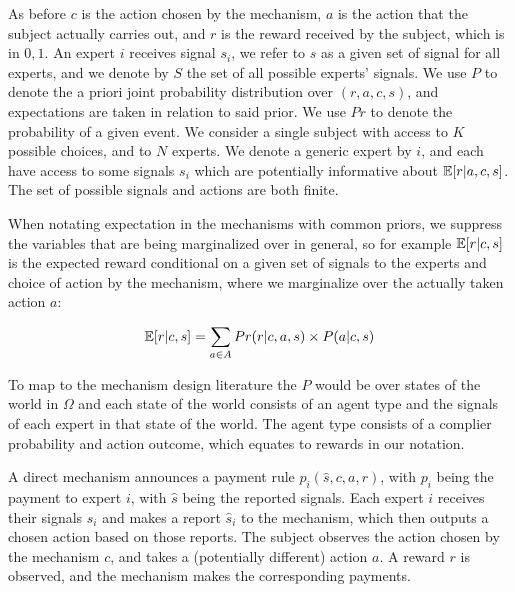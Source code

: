 As before $c$ is the action chosen by the mechanism, $a$ is the action that the subject actually carries out, and $r$ is the reward received by the subject, which is in ${0,1}$. An expert $i$ receives signal $s_i$, we refer to $s$ as a given set of signal for all experts, and we denote by $S$ the set of all possible experts' signals.
We use $P$ to denote the a priori joint probability distribution over $(r,a,c,s)$, and expectations are taken in relation to said prior.
We use $Pr$ to denote the probability of a given event.
We consider a single subject with access to $K$ possible choices, and to $N$ experts. We denote a generic expert by $i$, and each have access to some signals $s_i$ which are potentially informative about $\operatorname*{\mathbb E}[r|a,c,s]$. The set of possible signals and actions are both finite.


When notating expectation in the mechanisms with common priors, we suppress the variables that are being marginalized over in general, so for example $\operatorname*{\mathbb E}[r|c,s]$ is the expected reward conditional on a given set of signals to the experts and choice of action by the mechanism, where we marginalize over the actually taken action $a$:

\[
\operatorname*{\mathbb E}[r|c,s] = \sum_{a \in A} Pr(r|c,a,s) \times P(a|c,s) 
\]


To map to the mechanism design literature the $P$ would be over states of the world in $\Omega$ and each state of the world consists of an agent type and the signals of each expert in that state of the world. The agent type consists of a complier probability and action outcome, which equates to rewards in our notation.




A direct mechanism announces a payment rule $p_i(\hat{s}, c,a,r)$, with $p_i$ being the payment to expert $i$, with $\hat{s}$ being the reported signals. 
Each expert $i$ receives their signals $s_i$ and makes a report $\hat{s}_i$ to the mechanism, which then outputs a chosen action based on those reports.
The subject observes the action chosen by the mechanism $c$, and takes a (potentially different) action $a$. A reward $r$ is observed, and the mechanism makes the corresponding payments.

